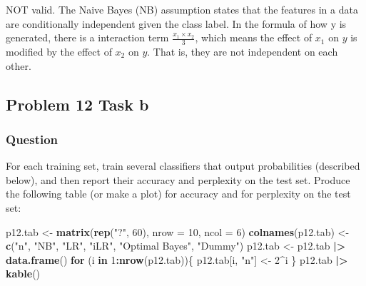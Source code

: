 \documentclass[
]{article}
\newenvironment{Shaded}{\begin{snugshade}}{\end{snugshade}}
\newcommand{\AttributeTok}[1]{\textcolor[rgb]{0.13,0.29,0.53}{#1}}
\newcommand{\ControlFlowTok}[1]{\textcolor[rgb]{0.13,0.29,0.53}{\textbf{#1}}}
\newcommand{\DecValTok}[1]{\textcolor[rgb]{0.00,0.00,0.81}{#1}}
\newcommand{\FunctionTok}[1]{\textcolor[rgb]{0.13,0.29,0.53}{\textbf{#1}}}
\newcommand{\NormalTok}[1]{#1}
\newcommand{\OtherTok}[1]{\textcolor[rgb]{0.56,0.35,0.01}{#1}}
\newcommand{\SpecialCharTok}[1]{\textcolor[rgb]{0.81,0.36,0.00}{\textbf{#1}}}
\newcommand{\StringTok}[1]{\textcolor[rgb]{0.31,0.60,0.02}{#1}}
\begin{document}
NOT valid. The Naive Bayes (NB) assumption states that the features in a
data are conditionally independent given the class label. In the formula
of how y is generated, there is a interaction term
\(\frac{x_1 \times x_2}{3}\), which means the effect of \(x_1\) on \(y\)
is modified by the effect of \(x_2\) on \(y\). That is, they are not
independent on each other.

\hypertarget{problem-12-task-b}{%
\subsection{Problem 12 Task b}\label{problem-12-task-b}}

\hypertarget{question-9}{%
\subsubsection{Question}\label{question-9}}

For each training set, train several classifiers that output
probabilities (described below), and then report their accuracy and
perplexity on the test set. Produce the following table (or make a plot)
for accuracy and for perplexity on the test set:

\begin{Shaded}
\begin{Highlighting}[]
\NormalTok{p12.tab }\OtherTok{\textless{}{-}} \FunctionTok{matrix}\NormalTok{(}\FunctionTok{rep}\NormalTok{(}\StringTok{"?"}\NormalTok{, }\DecValTok{60}\NormalTok{), }\AttributeTok{nrow =} \DecValTok{10}\NormalTok{, }\AttributeTok{ncol =} \DecValTok{6}\NormalTok{)}
\FunctionTok{colnames}\NormalTok{(p12.tab) }\OtherTok{\textless{}{-}} \FunctionTok{c}\NormalTok{(}\StringTok{"n"}\NormalTok{, }\StringTok{"NB"}\NormalTok{, }\StringTok{"LR"}\NormalTok{, }\StringTok{"iLR"}\NormalTok{, }\StringTok{"Optimal Bayes"}\NormalTok{, }\StringTok{"Dummy"}\NormalTok{)}
\NormalTok{p12.tab }\OtherTok{\textless{}{-}}\NormalTok{ p12.tab }\SpecialCharTok{|\textgreater{}} \FunctionTok{data.frame}\NormalTok{()}
\ControlFlowTok{for}\NormalTok{ (i }\ControlFlowTok{in} \DecValTok{1}\SpecialCharTok{:}\FunctionTok{nrow}\NormalTok{(p12.tab))\{}
\NormalTok{  p12.tab[i, }\StringTok{"n"}\NormalTok{] }\OtherTok{\textless{}{-}} \DecValTok{2}\SpecialCharTok{\^{}}\NormalTok{i}
\NormalTok{\}}
\NormalTok{p12.tab }\SpecialCharTok{|\textgreater{}} \FunctionTok{kable}\NormalTok{()}
\end{Highlighting}
\end{Shaded}
\end{document}
